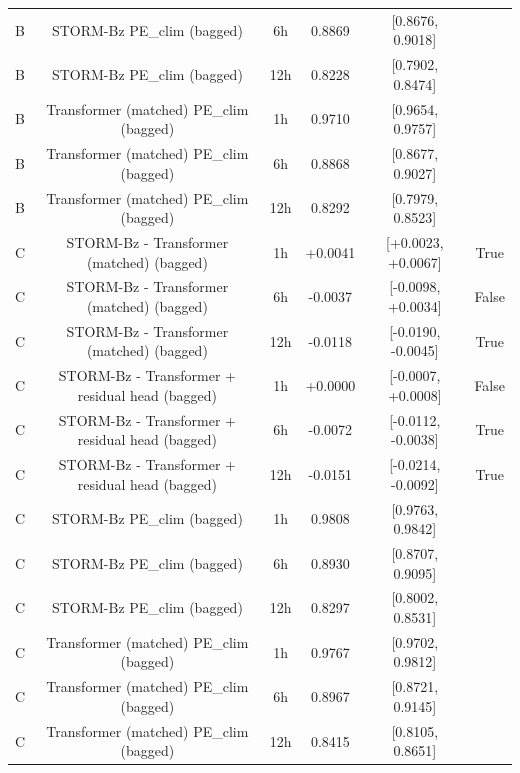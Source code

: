 \begin{tabular}{lccccc}
B & STORM-Bz PE\_clim (bagged) & 6h & 0.8869 & [0.8676, 0.9018] &  \\
B & STORM-Bz PE\_clim (bagged) & 12h & 0.8228 & [0.7902, 0.8474] &  \\
B & Transformer (matched) PE\_clim (bagged) & 1h & 0.9710 & [0.9654, 0.9757] &  \\
B & Transformer (matched) PE\_clim (bagged) & 6h & 0.8868 & [0.8677, 0.9027] &  \\
B & Transformer (matched) PE\_clim (bagged) & 12h & 0.8292 & [0.7979, 0.8523] &  \\
C & STORM-Bz - Transformer (matched) (bagged) & 1h & +0.0041 & [+0.0023, +0.0067] & True \\
C & STORM-Bz - Transformer (matched) (bagged) & 6h & -0.0037 & [-0.0098, +0.0034] & False \\
C & STORM-Bz - Transformer (matched) (bagged) & 12h & -0.0118 & [-0.0190, -0.0045] & True \\
C & STORM-Bz - Transformer + residual head (bagged) & 1h & +0.0000 & [-0.0007, +0.0008] & False \\
C & STORM-Bz - Transformer + residual head (bagged) & 6h & -0.0072 & [-0.0112, -0.0038] & True \\
C & STORM-Bz - Transformer + residual head (bagged) & 12h & -0.0151 & [-0.0214, -0.0092] & True \\
C & STORM-Bz PE\_clim (bagged) & 1h & 0.9808 & [0.9763, 0.9842] &  \\
C & STORM-Bz PE\_clim (bagged) & 6h & 0.8930 & [0.8707, 0.9095] &  \\
C & STORM-Bz PE\_clim (bagged) & 12h & 0.8297 & [0.8002, 0.8531] &  \\
C & Transformer (matched) PE\_clim (bagged) & 1h & 0.9767 & [0.9702, 0.9812] &  \\
C & Transformer (matched) PE\_clim (bagged) & 6h & 0.8967 & [0.8721, 0.9145] &  \\
C & Transformer (matched) PE\_clim (bagged) & 12h & 0.8415 & [0.8105, 0.8651] &  \\
\bottomrule
\end{tabular}
